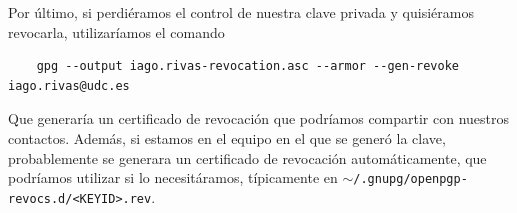 Por último, si perdiéramos el control de nuestra clave privada y quisiéramos revocarla, utilizaríamos el comando

\begin{verbatim}
    gpg --output iago.rivas-revocation.asc --armor --gen-revoke iago.rivas@udc.es
\end{verbatim}

Que generaría un certificado de revocación que podríamos compartir con nuestros contactos. Además, si estamos en el equipo en el que se generó la clave, probablemente se generara un certificado de revocación automáticamente, que podríamos utilizar si lo necesitáramos, típicamente en \texttt{$\sim$/.gnupg/openpgp-revocs.d/<KEYID>.rev}.
